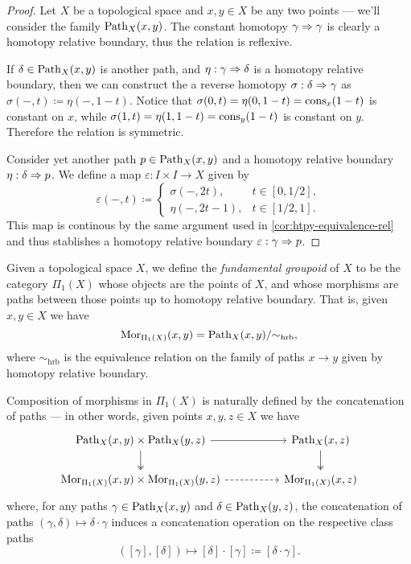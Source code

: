 \begin{proof}
Let \(X\) be a topological space and \(x, y \in X\) be any two points --- we'll
consider the family \(\operatorname{Path}_X(x, y)\). The constant homotopy \(\gamma \Rightarrow
\gamma\) is clearly a homotopy relative boundary, thus the relation is
reflexive.

If \(\delta \in \operatorname{Path}_X(x, y)\) is another path, and \(\eta: \gamma \Rightarrow
\delta\) is a homotopy relative boundary, then we can construct the a reverse
homotopy \(\sigma: \delta \Rightarrow \gamma\) as \(\sigma(-, t) \coloneq \eta(-, 1 -
t)\). Notice that \(\sigma(0, t) = \eta(0, 1 - t) = \operatorname{cons}_x(1 - t)\) is
constant on \(x\), while \(\sigma(1, t) = \eta(1, 1 - t) = \operatorname{cons}_y(1 - t)\) is
constant on \(y\). Therefore the relation is symmetric.

Consider yet another path \(p \in \operatorname{Path}_X(x, y)\) and a homotopy relative
boundary \(\eta: \delta \Rightarrow p\). We define a map \(\varepsilon: I \times I \to
X\) given by
\[
\varepsilon(-, t) \coloneq
\begin{cases}
  \sigma(-, 2t), &t \in [0, 1/2], \\
  \eta(-, 2 t - 1), &t \in [1/2, 1].
\end{cases}
\]
This map is continous by the same argument used in
\cref{cor:htpy-equivalence-rel} and thus stablishes a homotopy relative boundary
\(\varepsilon: \gamma \Rightarrow p\).
\end{proof}

\begin{definition}
\label{def:fundamental-groupoid}
Given a topological space \(X\), we define the \emph{fundamental groupoid} of
\(X\) to be the category \(\Pi_1(X)\) whose objects are the points of \(X\), and
whose morphisms are paths between those points up to homotopy relative boundary.
That is, given \(x, y \in X\) we have
\[
\operatorname{Mor}_{\Pi_1(X)}(x, y) = \operatorname{Path}_X(x, y)/{\sim_{\text{hrb}}},
\]
where \(\sim_{\text{hrb}}\) is the equivalence relation on the family of paths
\(x \to y\) given by homotopy relative boundary.

Composition of morphisms in \(\Pi_1(X)\) is naturally defined by the
concatenation of paths --- in other words, given points \(x, y, z \in X\) we
have
\[
\begin{tikzcd}
{\Path_X(x, y) \times \Path_X(y, z)}
\ar[d, two heads] \ar[rr]
&&{\Path_X(x, z)} \ar[d, two heads]
\\
{\Hom_{\Pi_1(X)}(x, y) \times \Hom_{\Pi_1(X)}(y, z)}
\ar[rr, dashed]
&&{\Hom_{\Pi_1(X)}(x, z)}
\end{tikzcd}
\]
where, for any paths \(\gamma \in \operatorname{Path}_X(x, y)\) and \(\delta \in \operatorname{Path}_X(y,
z)\), the concatenation of paths \((\gamma, \delta) \mapsto \delta \cdot \gamma\) induces
a concatenation operation on the respective class paths
\[
([\gamma], [\delta]) \longmapsto
[\delta] \cdot [\gamma] \coloneq [\delta \cdot \gamma].
\]
\end{definition}

